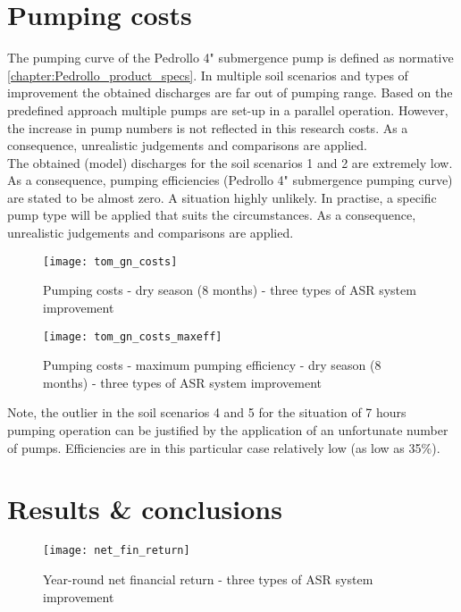 \section{Pumping costs}
\label{section:pump_costs}
The pumping curve of the Pedrollo 4" submergence pump is defined as normative \ref{chapter:Pedrollo_product_specs}. In multiple soil scenarios and types of improvement the obtained discharges are far out of pumping range. Based on the predefined approach multiple pumps are set-up in a parallel operation. However, the increase in pump numbers is not reflected in this research costs. As a consequence, unrealistic judgements and comparisons are applied. \\

The obtained (model) discharges for the soil scenarios 1 and 2 are extremely low. As a consequence, pumping efficiencies (Pedrollo 4" submergence pumping curve) are stated to be almost zero. A situation highly unlikely. In practise, a specific pump type will be applied that suits the circumstances. As a consequence, unrealistic judgements and comparisons are applied.

\begin{figure}[h!]
 \centering
 \texttt{[image: tom\_gn\_costs]}
 \captionsetup{justification=centering} 
 \caption{Pumping costs - dry season (8 months) - three types of ASR system improvement}
 \label{fig:tom_gn_yield}
\end{figure}

\begin{figure}[h!]
 \centering
 \texttt{[image: tom\_gn\_costs\_maxeff]}
 \captionsetup{justification=centering} 
 \caption{Pumping costs - maximum pumping efficiency - dry season (8 months) - three types of ASR system improvement}
 \label{fig:tom_gn_yield_maxeff}
\end{figure}

Note, the outlier in the soil scenarios 4 and 5 for the situation of 7 hours pumping operation can be justified by the application of an unfortunate number of pumps. Efficiencies are in this particular case relatively low (as low as 35\%). \\

\section{Results \& conclusions}
\label{section:Yields_conclusions}

\begin{figure}[h!]
 \centering
 \texttt{[image: net\_fin\_return]}
 \captionsetup{justification=centering} 
 \caption{Year-round net financial return - three types of ASR system improvement}
 \label{fig:net_fin_return}
\end{figure}

